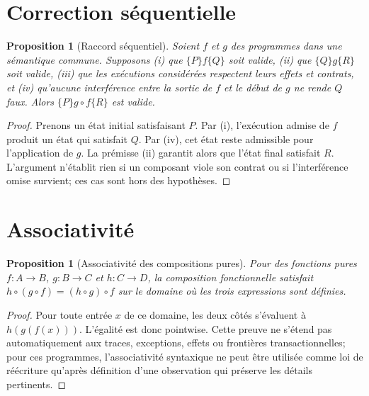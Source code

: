 \documentclass[11pt,a4paper,openany]{book}
\theoremstyle{definition}
\theoremstyle{plain}
\newtheorem{proposition}[definition]{Proposition}
\theoremstyle{remark}
\begin{document}
\section{Correction séquentielle}
\begin{proposition}[Raccord séquentiel]
Soient $f$ et $g$ des programmes dans une sémantique commune. Supposons (i) que $\{P\}f\{Q\}$ soit valide, (ii) que $\{Q\}g\{R\}$ soit valide, (iii) que les exécutions considérées respectent leurs effets et contrats, et (iv) qu'aucune interférence entre la sortie de $f$ et le début de $g$ ne rende $Q$ faux. Alors $\{P\}g\circ f\{R\}$ est valide.
\end{proposition}
\begin{proof}
Prenons un état initial satisfaisant $P$. Par (i), l'exécution admise de $f$ produit un état qui satisfait $Q$. Par (iv), cet état reste admissible pour l'application de $g$. La prémisse (ii) garantit alors que l'état final satisfait $R$. L'argument n'établit rien si un composant viole son contrat ou si l'interférence omise survient; ces cas sont hors des hypothèses.
\end{proof}

\section{Associativité}
\begin{proposition}[Associativité des compositions pures]
Pour des fonctions pures $f:A\to B$, $g:B\to C$ et $h:C\to D$, la composition fonctionnelle satisfait $h\circ(g\circ f)=(h\circ g)\circ f$ sur le domaine où les trois expressions sont définies.
\end{proposition}
\begin{proof}
Pour toute entrée $x$ de ce domaine, les deux côtés s'évaluent à $h(g(f(x)))$. L'égalité est donc pointwise. Cette preuve ne s'étend pas automatiquement aux traces, exceptions, effets ou frontières transactionnelles; pour ces programmes, l'associativité syntaxique ne peut être utilisée comme loi de réécriture qu'après définition d'une observation qui préserve les détails pertinents.
\end{proof}
\end{document}

